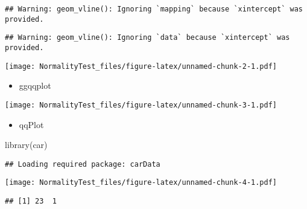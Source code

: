 \documentclass[
]{article}
\newenvironment{Shaded}{\begin{snugshade}}{\end{snugshade}}
\newcommand{\AttributeTok}[1]{\textcolor[rgb]{0.77,0.63,0.00}{#1}}
\newcommand{\FunctionTok}[1]{\textcolor[rgb]{0.00,0.00,0.00}{#1}}
\newcommand{\NormalTok}[1]{#1}
\newcommand{\SpecialCharTok}[1]{\textcolor[rgb]{0.00,0.00,0.00}{#1}}
\newcommand{\StringTok}[1]{\textcolor[rgb]{0.31,0.60,0.02}{#1}}
\providecommand{\tightlist}{%
  \setlength{\itemsep}{0pt}\setlength{\parskip}{0pt}}
\begin{document}
\begin{verbatim}
## Warning: geom_vline(): Ignoring `mapping` because `xintercept` was provided.
\end{verbatim}

\begin{verbatim}
## Warning: geom_vline(): Ignoring `data` because `xintercept` was provided.
\end{verbatim}

\texttt{[image: NormalityTest\_files/figure-latex/unnamed-chunk-2-1.pdf]}

\begin{itemize}
\tightlist
\item
  ggqqplot
\end{itemize}

\begin{Shaded}
\end{Shaded}

\texttt{[image: NormalityTest\_files/figure-latex/unnamed-chunk-3-1.pdf]}

\begin{itemize}
\tightlist
\item
  qqPlot
\end{itemize}

\begin{Shaded}
\begin{Highlighting}[]
\FunctionTok{library}\NormalTok{(car)}
\end{Highlighting}
\end{Shaded}

\begin{verbatim}
## Loading required package: carData
\end{verbatim}

\begin{Shaded}
\end{Shaded}

\texttt{[image: NormalityTest\_files/figure-latex/unnamed-chunk-4-1.pdf]}

\begin{verbatim}
## [1] 23  1
\end{verbatim}
\end{document}

